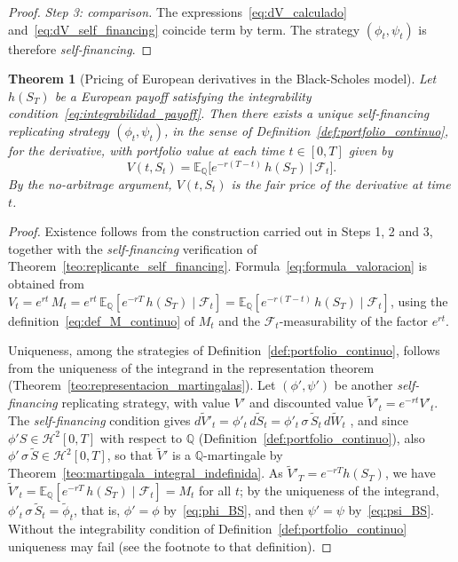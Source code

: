 \documentclass[11pt,a4paper,oneside]{report}
\theoremstyle{plain}
\newtheorem{teorema}{Theorem}[chapter]
\theoremstyle{definition}
\theoremstyle{remark}
\newcommand{\E}{\mathbb{E}}
\newcommand{\Q}{\mathbb{Q}}
\newcommand{\F}{\mathcal{F}}
\newcommand{\1}{\mathbf{1}}
\begin{document}
\begin{proof}
\emph{Step 3: comparison.} The
expressions~\eqref{eq:dV_calculado} and~\eqref{eq:dV_self_financing}
coincide term by term. The strategy $(\phi_t, \psi_t)$ is therefore
\emph{self-financing}.
\end{proof}

\begin{teorema}[Pricing of European derivatives in the Black-Scholes model]
\label{teo:valoracion_BS}
Let $h(S_T)$ be a European \emph{payoff} satisfying the integrability
condition~\eqref{eq:integrabilidad_payoff}. Then there exists a
unique \emph{self-financing} replicating strategy $(\phi_t, \psi_t)$, in the sense of Definition~\ref{def:portfolio_continuo},
for the derivative, with portfolio value at each time $t \in [0, T]$
given by
\begin{equation}\label{eq:formula_valoracion}
  \boxed{\;
    V(t, S_t) = \E_\Q\!\bigl[e^{-r(T - t)}\, h(S_T) \,\big|\, \F_t\bigr]. \;}
\end{equation}
By the no-arbitrage argument, $V(t, S_t)$ is the fair price of the
derivative at time $t$.
\end{teorema}

\begin{proof}
Existence follows from the construction carried out in Steps 1, 2
and 3, together with the \emph{self-financing} verification of
Theorem~\ref{teo:replicante_self_financing}.
Formula~\eqref{eq:formula_valoracion} is obtained from
$V_t = e^{rt}\, M_t = e^{rt}\, \E_\Q[e^{-rT}\, h(S_T) \mid \F_t]
= \E_\Q[e^{-r(T-t)}\, h(S_T) \mid \F_t]$, using the
definition~\eqref{eq:def_M_continuo} of $M_t$ and the
$\F_t$-measurability of the factor $e^{rt}$.

Uniqueness, among the strategies of Definition~\ref{def:portfolio_continuo}, follows from the uniqueness of the integrand in the representation theorem (Theorem~\ref{teo:representacion_martingalas}). Let $(\phi', \psi')$ be another \emph{self-financing} replicating strategy, with value $V'$ and discounted value $\widetilde V'_t = e^{-rt} V'_t$. The \emph{self-financing} condition gives $d\widetilde V'_t = \phi'_t\, d\widetilde S_t = \phi'_t\, \sigma\, \widetilde S_t\, d\widetilde W_t$ \cite[Lemma~5.1.3]{etheridge}, and since $\phi' S \in \mathcal{H}^2[0, T]$ with respect to $\Q$ (Definition~\ref{def:portfolio_continuo}), also $\phi'\, \sigma\, \widetilde S \in \mathcal{H}^2[0, T]$, so that $\widetilde V'$ is a $\Q$-martingale by Theorem~\ref{teo:martingala_integral_indefinida}. As $\widetilde V'_T = e^{-rT} h(S_T)$, we have $\widetilde V'_t = \E_\Q[e^{-rT}\, h(S_T) \mid \F_t] = M_t$ for all $t$; by the uniqueness of the integrand, $\phi'_t\, \sigma\, \widetilde S_t = \widetilde\phi_t$, that is, $\phi' = \phi$ by~\eqref{eq:phi_BS}, and then $\psi' = \psi$ by~\eqref{eq:psi_BS}. Without the integrability condition of Definition~\ref{def:portfolio_continuo} uniqueness may fail (see the footnote to that definition).
\end{proof}
\end{document}

